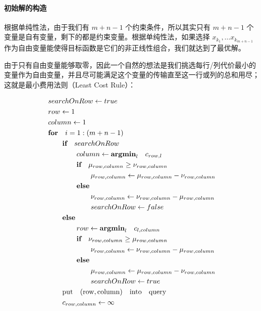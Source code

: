 \documentclass[]{article}
\let\oldparagraph\paragraph
\renewcommand{\paragraph}[1]{\oldparagraph{#1}\mbox{}}
\begin{document}
\paragraph{初始解的构造}

根据单纯性法，由于我们有 \(m+n-1\) 个约束条件，所以其实只有 \(m+n-1\)
个变量是自有变量，剩下的都是约束变量。根据单纯性法，如果选择
\(x_{k_1}, \dots x_{k_{m+n-1}}\)
作为自由变量能使得目标函数是它们的非正线性组合，我们就达到了最优解。

由于只有自由变量能够取零，因此一个自然的想法是我们挑选每行/列代价最小的变量作为自由变量，并且尽可能满足这个变量的传输直至这一行或列的总和用尽；这就是最小费用法则（Least
Cost Rule）：

\begin{align*}
& searchOnRow \leftarrow true \\
& row \leftarrow 1 \\
& column \leftarrow 1 \\
& \textbf{for} \quad i=1:(m+n-1) \\
& \qquad \textbf{if} \quad searchOnRow \\
& \qquad \qquad column \leftarrow \textbf{argmin}_l \quad c_{row, l} \\
& \qquad \qquad \textbf{if} \quad \mu_{row, column} \ge \nu_{row, column} \\
& \qquad \qquad \qquad \mu_{row, column} \leftarrow \mu_{row, column} - \nu_{row, column} \\
& \qquad \qquad \textbf{else} \\
& \qquad \qquad \qquad \nu_{row, column} \leftarrow \nu_{row, column} - \mu_{row, column} \\
& \qquad \qquad \qquad searchOnRow \leftarrow false \\
& \qquad \textbf{else} \\
& \qquad \qquad row \leftarrow \textbf{argmin}_l \quad c_{l, column} \\
& \qquad \qquad \textbf{if} \quad \nu_{row, column} \ge \mu_{row, column} \\
& \qquad \qquad \qquad \nu_{row, column} \leftarrow \nu_{row, column} - \mu_{row, column} \\
& \qquad \qquad \textbf{else} \\
& \qquad \qquad \qquad \mu_{row, column} \leftarrow \mu_{row, column} - \nu_{row, column} \\
& \qquad \qquad \qquad searchOnRow \leftarrow true \\
& \qquad \rm{put \quad (row, column) \quad into \quad query} \\
& \qquad c_{row, column} \leftarrow \infty \\
\end{align*}
\end{document}

